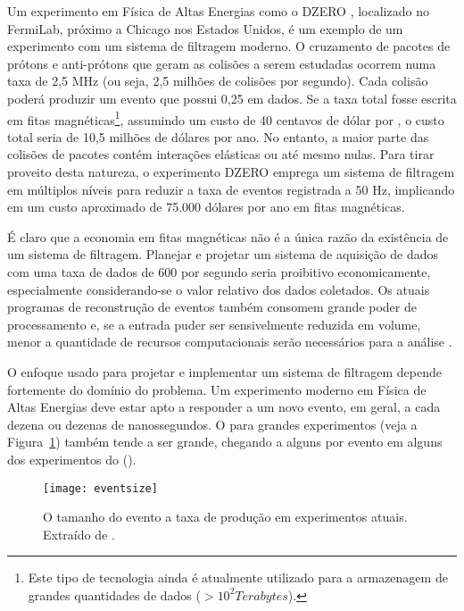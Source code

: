 Um experimento em Física de Altas Energias como o DZERO \cite{d0}, localizado
no FermiLab, próximo a Chicago nos Estados Unidos, é um exemplo de um
experimento com um sistema de filtragem moderno. O cruzamento de pacotes de
prótons e anti-prótons que geram as colisões a serem estudadas ocorrem numa
taxa de 2,5 MHz (ou seja, 2,5 milhões de colisões por segundo). Cada colisão
poderá produzir um evento que possui 0,25  em dados. Se a taxa
total fosse escrita em fitas magnéticas\footnote{Este tipo de tecnologia ainda
é atualmente utilizado para a armazenagem de grandes quantidades de dados ($>
10^{2} Terabytes$).}, assumindo um custo de 40 centavos de dólar por
, o custo total seria de 10,5 milhões de dólares por ano. No 
entanto, a maior parte das colisões de pacotes contém interações elásticas ou
até mesmo nulas. Para tirar proveito desta natureza, o experimento DZERO
emprega um sistema de filtragem em múltiplos níveis para reduzir a taxa de
eventos registrada a 50 Hz, implicando em um custo aproximado de 75.000
dólares por ano em fitas magnéticas.

É claro que a economia em fitas magnéticas não é a única razão da existência
de um sistema de filtragem. Planejar e projetar um sistema de aquisição de
dados com uma taxa de dados de 600  por segundo seria
proibitivo economicamente, especialmente considerando-se o valor relativo dos
dados coletados. Os atuais programas de reconstrução de eventos também
consomem grande poder de processamento e, se a entrada puder ser sensivelmente
reduzida em volume, menor a quantidade de recursos computacionais serão
necessários para a análise .

O enfoque usado para projetar e implementar um sistema de filtragem depende
fortemente do domínio do problema. Um experimento moderno em Física de Altas
Energias deve estar apto a responder a um novo evento, em geral, a cada
dezena ou dezenas de nanossegundos. O  para grandes
experimentos (veja a Figura~\ref{fig:eventsize}) também tende a ser grande,
chegando a alguns  por evento em alguns dos experimentos do
 ().

\begin{figure}
\begin{center}
\texttt{[image: eventsize]}
\end{center}
\caption{O tamanho do evento  a taxa de produção em experimentos
atuais. Extraído de \cite{trig-review}.}
\label{fig:eventsize}
\end{figure}

